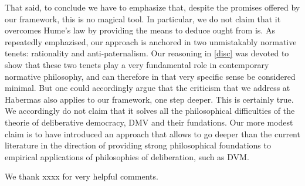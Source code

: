 \documentclass[smallextended,nospthms,natbib]{svjour3}
\begin{document}
That said, to conclude we have to emphasize that, despite the promises offered by our framework, this is no magical tool. In particular, we do not claim that it overcomes Hume's law by providing the means to deduce ought from is. As repeatedly emphazised, our approach is anchored in two unmistakably normative tenets: rationality and anti-paternalism. Our reasoning in \cref{disc} was devoted to show that these two tenets play a very fundamental role in contemporary normative philosophy, and can therefore in that very specific sense be considered minimal. But one could accordingly argue that the criticism that we address at Habermas also applies to our framework, one step deeper. This is certainly true. We accordingly do not claim that it solves all the philosophical difficulties of the theorie of deliberative democracy, DMV and their fundations. Our more modest claim is to have introduced an approach that allows to go deeper than the current literature in the direction of providing strong philosophical foundations to empirical applications of philosophies of deliberation, such as DVM. 


\begin{acknowledgements}
We thank xxxx for very helpful comments.
\end{acknowledgements}


\end{document}
